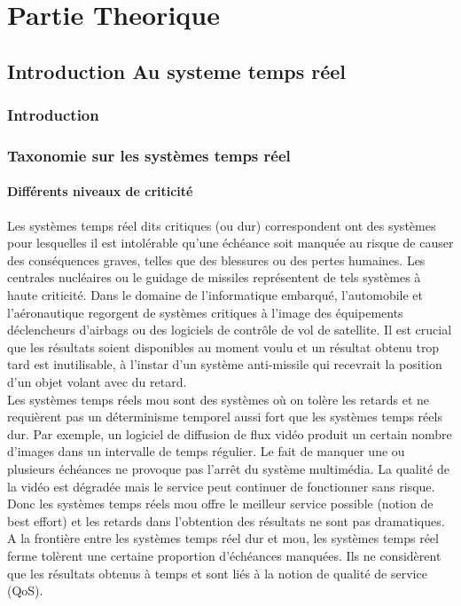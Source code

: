 \part{Partie Theorique}
\chapter{Introduction Au systeme temps réel}
\minitoc
\section{Introduction}
\section{Taxonomie sur les systèmes temps réel}
\subsection*{Différents niveaux de criticité}
\vspace{-1cm}
Les systèmes temps réel dits critiques (ou dur) correspondent ont des systèmes pour lesquelles il est intolérable qu’une échéance soit manquée au risque de causer des conséquences graves, telles que des blessures ou des pertes humaines. Les centrales nucléaires ou le guidage de missiles représentent de tels systèmes à haute criticité. Dans le domaine de l’informatique embarqué, l’automobile et l’aéronautique regorgent de systèmes critiques à l’image des équipements déclencheurs d’airbags ou des logiciels de contrôle de vol de satellite. Il est crucial que les résultats soient disponibles au moment voulu et un résultat obtenu trop tard est inutilisable, à l’instar d’un système anti-missile qui recevrait la position d’un objet volant avec du retard.
\\ \indent Les systèmes temps réels mou sont des systèmes où on tolère les retards et ne requièrent pas un déterminisme temporel aussi fort que les systèmes temps réels dur.
Par exemple, un logiciel de diffusion de flux vidéo produit un certain nombre d’images dans un intervalle de temps régulier. Le fait de manquer une ou plusieurs échéances ne provoque pas l’arrêt du système multimédia. La qualité de la vidéo est dégradée mais le service peut continuer de fonctionner sans risque. Donc les systèmes temps réels mou  offre le  meilleur service possible (notion de best eﬀort) et les retards dans l’obtention des résultats ne sont pas dramatiques.
\\ \indent A la frontière entre les systèmes temps réel dur et mou, les systèmes temps réel ferme tolèrent une certaine proportion d’échéances manquées. Ils ne considèrent que les résultats obtenus à temps et sont liés à la notion de qualité de service (QoS).

